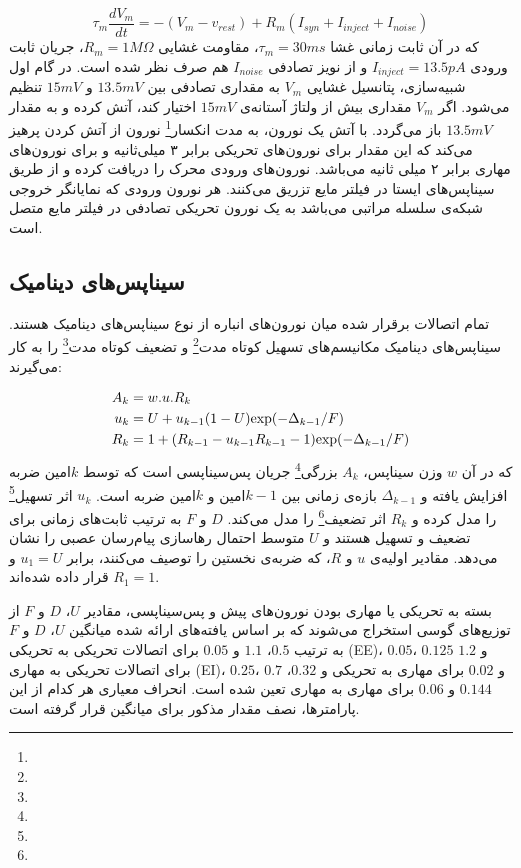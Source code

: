 \begin{equation} \label{eq:LIF}
\tau _m \frac{dV_m}{dt} = -(V_m-v_{rest})+R_m(I_{syn}+I_{inject}+I_{noise})
\end{equation}
که در آن ثابت زمانی غشا $\tau_m=30ms$، مقاومت غشایی $R_m=1 M\Omega $، جریان ثابت ورودی $I_{inject} = 13.5 pA$ و از نویز تصادفی $I_{noise}$ هم صرف نظر شده است. در گام اول شبیه‌سازی، پتانسیل غشایی $V_m$ به مقداری تصادفی بین $13.5 mV$ و $15 mV$ تنظیم می‌شود. اگر $V_m$ مقداری بیش از ولتاژ آستانه‌ی $15 mV$ اختیار کند، آتش کرده و به مقدار $13.5 mV$ باز می‌گردد. با آتش یک نورون، به مدت انکسار\footnote{} نورون از آتش کردن پرهیز می‌کند که این مقدار برای نورون‌های تحریکی برابر ۳ میلی‌ثانیه و برای نورون‌های مهاری برابر ۲ میلی ثانیه می‌باشد\cite{joshi2007memory}. 
نورون‌های ورودی محرک را دریافت کرده و از طریق سیناپس‌های ایستا در فیلتر مایع تزریق می‌کنند. هر نورون ورودی که نمایانگر خروجی شبکه‌ی سلسله مراتبی می‌باشد به یک نورون تحریکی تصادفی در فیلتر مایع متصل است.

\subsection{سیناپس‌های دینامیک}
تمام اتصالات برقرار شده میان نورون‌های انباره از نوع سیناپس‌های دینامیک هستند. سیناپس‌های دینامیک مکانیسم‌های تسهیل کوتاه مدت\footnote{} و تضعیف کوتاه مدت\footnote{} را به کار می‌گیرند\cite{legenstein2007edge}:

\begin{equation} \label{eq:STP}
\begin{aligned}
A_k &= w.u.R_k \\ 
u_k &= U + u_{k-1}(1-U)\textup{exp}(-\Delta_{k-1}/F) \\ 
R_k &= 1+(R_{k-1}-u_{k-1}R_{k-1}-1)\textup{exp}(-\Delta_{k-1}/F)
\end{aligned}
\end{equation}
که در آن $w$ وزن سیناپس، $A_k$ بزرگی\footnote{} جریان پس‌سیناپسی است که توسط $k$امین ضربه افزایش یافته و $\Delta_{k-1}$ بازه‌ی زمانی بین $k-1$امین و $k$امین ضربه است. $u_k$ اثر تسهیل\footnote{} را مدل کرده و $R_k$ اثر تضعیف\footnote{} را مدل می‌کند. $D$ و $F$ به ترتیب ثابت‌های زمانی برای تضعیف و تسهیل هستند و $U$ متوسط احتمال رهاسازی پیام‌رسان عصبی را نشان می‌دهد. مقادیر اولیه‌ی $u$ و $R$، که ضربه‌ی نخستین را توصیف می‌کنند، برابر $u_1=U$ و $R_1=1$ قرار داده شده‌اند. 

بسته به تحریکی یا مهاری بودن نورون‌های پیش و پس‌سیناپسی، مقادیر $U$، $D$ و $F$ از توزیع‌های گوسی استخراج می‌شوند که بر اساس یافته‌های ارائه شده\cite{joshi2007memory} میانگین $U$، $D$ و $F$ به ترتیب $0.5$، $1.1$ و $0.05$ برای اتصالات تحریکی به تحریکی (EE)، $0.05$، $0.125$ و $1.2$ برای اتصالات تحریکی به مهاری (EI)، $0.25$، $0.7$ و $0.02$ برای مهاری به تحریکی و $0.32$، $0.144$ و $0.06$ برای مهاری به مهاری تعین شده است. انحراف معیاری هر کدام از این پارامتر‌ها، نصف مقدار مذکور برای میانگین قرار گرفته است.

